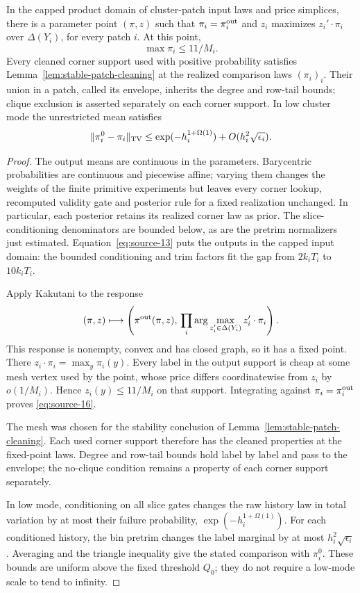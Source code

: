 \begin{proposition}\label{prop:balanced-patch-profiles}
In the capped product domain of cluster-patch input laws and price simplices, there is a parameter point \((\pi,z)\) such that \(\pi_i=\pi_i^{\rm out}\) and \(z_i\) maximizes \(z_i'\cdot\pi_i\) over \(\Delta(Y_i)\), for every patch \(i\). At this point,
\begin{equation}
 \max\pi_i\le 11/M_i . \label{eq:source-16}
\end{equation}
Every cleaned corner support used with positive probability satisfies Lemma~\ref{lem:stable-patch-cleaning} at the realized comparison laws \((\pi_i)_i\). Their union in a patch, called its envelope, inherits the degree and row-tail bounds; clique exclusion is asserted separately on each corner support. In low cluster mode the unrestricted mean satisfies
\[
 \|\pi_i^0-\pi_i\|_{\rm TV}
 \le \exp(-h_i^{1+\Omega(1)})+O(h_i^2\sqrt{\epsilon_i}).
\]
\end{proposition}

\begin{proof}
The output means are continuous in the parameters. Barycentric probabilities are continuous and piecewise affine; varying them changes the weights of the finite primitive experiments but leaves every corner lookup, recomputed validity gate and posterior rule for a fixed realization unchanged. In particular, each posterior retains its realized corner law as prior. The slice-conditioning denominators are bounded below, as are the pretrim normalizers just estimated. Equation~\eqref{eq:source-13} puts the outputs in the capped input domain: the bounded conditioning and trim factors fit the gap from \(2k_iT_i\) to \(10k_iT_i\).

Apply Kakutani to the response
\[
 (\pi,z)\longmapsto
 \left(\pi^{\rm out}(\pi,z),\,
       \prod_i\arg\max_{z_i'\in\Delta(Y_i)}z_i'\cdot\pi_i\right).
\]
This response is nonempty, convex and has closed graph, so it has a fixed point. There \(z_i\cdot\pi_i=\max_y\pi_i(y)\). Every label in the output support is cheap at some mesh vertex used by the point, whose price differs coordinatewise from \(z_i\) by \(o(1/M_i)\). Hence \(z_i(y)\le11/M_i\) on that support. Integrating against \(\pi_i=\pi_i^{\rm out}\) proves \eqref{eq:source-16}.

The mesh was chosen for the stability conclusion of Lemma~\ref{lem:stable-patch-cleaning}. Each used corner support therefore has the cleaned properties at the fixed-point laws. Degree and row-tail bounds hold label by label and pass to the envelope; the no-clique condition remains a property of each corner support separately.

In low mode, conditioning on all slice gates changes the raw history law in total variation by at most their failure probability, \(\exp(-h_i^{1+\Omega(1)})\). For each conditioned history, the bin pretrim changes the label marginal by at most \(h_i^2\sqrt{\epsilon_i}\). Averaging and the triangle inequality give the stated comparison with \(\pi_i^0\). These bounds are uniform above the fixed threshold \(Q_0\); they do not require a low-mode scale to tend to infinity.
\end{proof}

